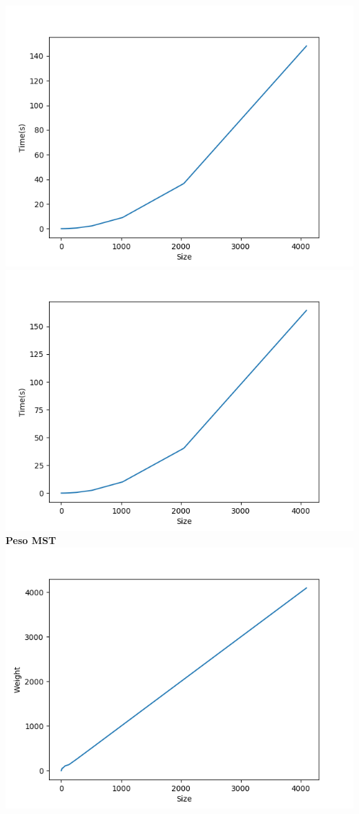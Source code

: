 \documentclass[]{article}
\begin{document}
\includegraphics[scale=0.5]{krusk_time_p=08.png}
\includegraphics[scale=0.5]{krusk_time_p=1.png}\\
\textbf{Peso MST}\\
\includegraphics[scale=0.5]{krusk_Weight_p=02.png}
\end{document}

